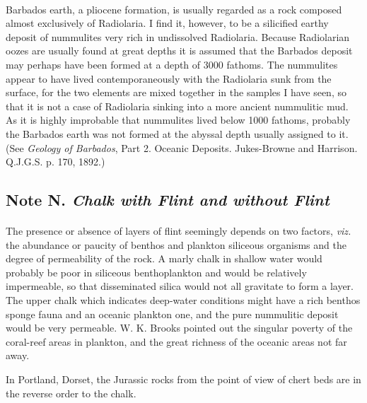\documentclass[a4paper, 12pt, oneside, landscape]{article}
\begin{document}
\paragraph{}
Barbados earth, a pliocene formation, is usually regarded as a rock composed almost exclusively of Radiolaria. I find it, however, to be a silicified earthy deposit of nummulites very rich in undissolved Radiolaria. Because Radiolarian oozes are usually found at great depths it is assumed that the Barbados deposit may perhaps have been formed at a depth of 3000 fathoms. The nummulites appear to have lived contemporaneously with the Radiolaria sunk from the surface, for the two elements are mixed together in the samples I have seen, so that it is not a case of Radiolaria sinking into a more ancient nummulitic mud. As it is highly improbable that nummulites lived below 1000 fathoms, probably the Barbados earth was not formed at the abyssal depth usually assigned to it. (See \emph{Geology of Barbados}, Part 2. Oceanic Deposits. Jukes-Browne and Harrison. Q.J.G.S. p. 170, 1892.)

\subsection{Note N. \emph{Chalk with Flint and without Flint}}
\paragraph{}
The presence or absence of layers of flint seemingly depends on two factors, \emph{viz.} the abundance or paucity of benthos and plankton siliceous organisms and the degree of permeability of the rock. A marly chalk in shallow water would probably be poor in siliceous benthoplankton and would be relatively impermeable, so that disseminated silica would not all gravitate to form a layer. The upper chalk which indicates deep-water conditions might have a rich benthos sponge fauna and an oceanic plankton one, and the pure nummulitic deposit would be very permeable. W. K. Brooks pointed out the singular poverty of the coral-reef areas in plankton, and the great richness of the oceanic areas not far away.

In Portland, Dorset, the Jurassic rocks from the point of view of chert beds are in the reverse order to the chalk.
\end{document}
